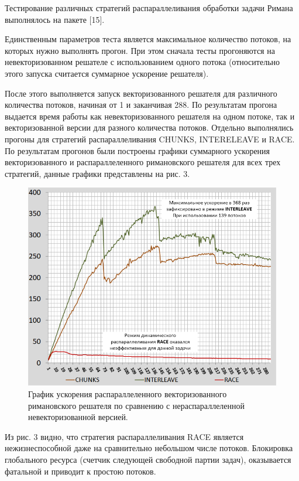 Тестирование различных стратегий распараллеливания обработки задачи Римана выполнялось на пакете [15].

Единственным параметров теста является максимальное количество потоков, на которых нужно выполнять прогон.
При этом сначала тесты прогоняются на невекторизованном решателе с использованием одного потока (относительно этого запуска считается суммарное ускорение решателя).

После этого выполняется запуск векторизованного решателя для различного количества потоков, начиная от 1 и заканчивая 288.
По результатам прогона выдается время работы как невекторизованного решателя на одном потоке, так и векторизованной версии для разного количества потоков.
Отдельно выполнялись прогоны для стратегий распараллеливания CHUNKS, INTERELEAVE и RACE.
По результатам прогонов были построены графики суммарного ускорения векторизованного и распараллеленного римановского решателя для всех трех стратегий, данные графики представлены на рис. 3.

\begin{figure}[ht]
\centering
\includegraphics[width=1.0\textwidth]{./pics/text_3_omp1/main_graph.png}
\caption{График ускорения распараллеленного векторизованного римановского решателя по сравнению с нераспараллеленной невекторизованной версией.}
\label{fig:text_3_omp1_main_graph}
\end{figure}

Из рис. 3 видно, что стратегия распараллеливания RACE является нежизнеспособной даже на сравнительно небольшом числе потоков.
Блокировка глобального ресурса (счетчик следующей свободной партии задач), оказывается фатальной и приводит к простою потоков.

